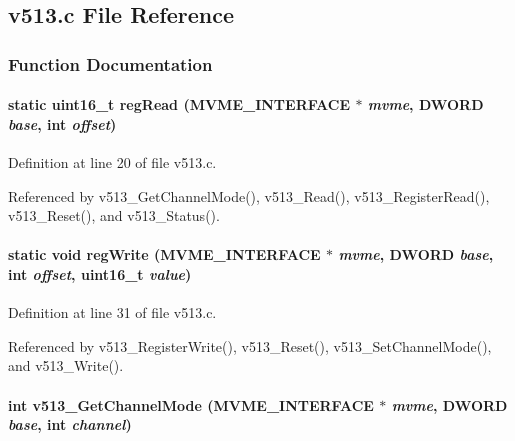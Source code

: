 \subsection{v513.c File Reference}
\label{v513_8c}


\subsubsection{Function Documentation}
\paragraph[{regRead}]{\setlength{\rightskip}{0pt plus 5cm}static uint16\_\-t regRead ({\bf MVME\_\-INTERFACE} $\ast$ {\em mvme}, \/  {\bf DWORD} {\em base}, \/  int {\em offset})}\hfill\label{v513_8c_a2356559ea09bb1038060090b3526cc09}


Definition at line 20 of file v513.c.

Referenced by v513\_\-GetChannelMode(), v513\_\-Read(), v513\_\-RegisterRead(), v513\_\-Reset(), and v513\_\-Status().
\paragraph[{regWrite}]{\setlength{\rightskip}{0pt plus 5cm}static void regWrite ({\bf MVME\_\-INTERFACE} $\ast$ {\em mvme}, \/  {\bf DWORD} {\em base}, \/  int {\em offset}, \/  uint16\_\-t {\em value})}\hfill\label{v513_8c_a9ef4dda4884da2045dbb6d441deaf8fe}


Definition at line 31 of file v513.c.

Referenced by v513\_\-RegisterWrite(), v513\_\-Reset(), v513\_\-SetChannelMode(), and v513\_\-Write().
\paragraph[{v513\_\-GetChannelMode}]{\setlength{\rightskip}{0pt plus 5cm}int v513\_\-GetChannelMode ({\bf MVME\_\-INTERFACE} $\ast$ {\em mvme}, \/  {\bf DWORD} {\em base}, \/  int {\em channel})}\hfill\label{v513_8c_a1a0c8a9ed02f747a1555d88719b4ff28}


